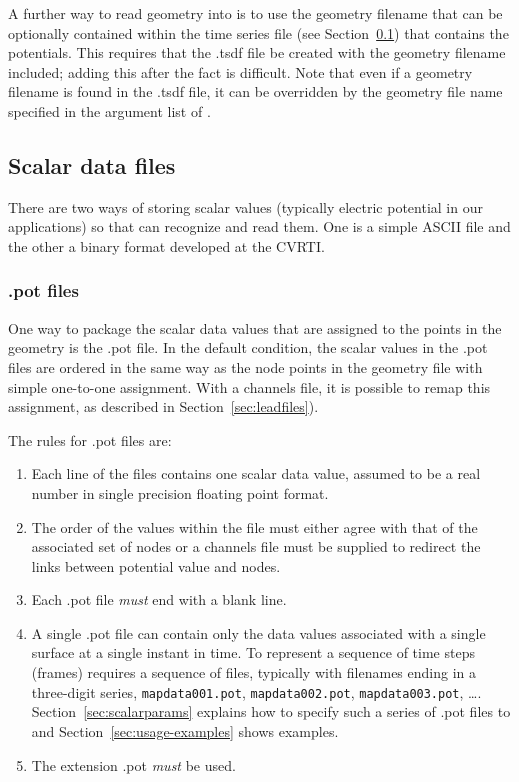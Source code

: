 A further way to read geometry into \map{} is to use the geometry filename
that can be optionally contained within the time series file (see
Section~\ref{sec:datafiles}) that contains the potentials.  This requires
that the .tsdf file be created with the geometry filename
included; adding this after the fact is difficult.  Note that even if a
geometry filename is found in the .tsdf file, it can be overridden
by the geometry file name specified in the argument list of \map{}.


\subsection{Scalar data files}
\label{sec:datafiles} 

There are two ways of storing scalar values (typically electric potential
in our applications) so that \map{} can recognize and read them.  One is a
simple ASCII file and the other a binary format developed at the
CVRTI\@. 

\subsubsection{.pot files}
\label{sec:potfiles} 

One way to package the scalar data values that are assigned to the points
in the geometry is the .pot file.  In the default condition,
the scalar values in the .pot files are ordered in the same way as
the node points in the geometry file with simple one-to-one assignment.
With a channels file, it is possible to remap this assignment, as described
in Section~\ref{sec:leadfiles}).

\noindent
The rules for .pot files are:
%
\begin{enumerate}
  \item Each line of the files contains one scalar data value, assumed to
        be a real number in single precision floating point format. 
  \item The order of the values within the file must either agree with that
        of the associated set of nodes or a channels file must be supplied
        to redirect the links between potential value and nodes.
  \item Each .pot file {\em must\/} end with a blank line.
  \item A single .pot file can contain only the data values
        associated with a single surface at a single instant in time.  To
        represent a sequence of time steps (frames) requires a sequence of
        files, typically with filenames ending in a three-digit series,
        \eg{} \texttt{mapdata001.pot}, \texttt{mapdata002.pot},
        \texttt{mapdata003.pot}, \ldots{}.  Section~\ref{sec:scalarparams}
        explains how to specify such a series of .pot files to \map{} and
        Section~\ref{sec:usage-examples} shows examples.
  \item The extension .pot {\em must\/} be used.
\end{enumerate}


